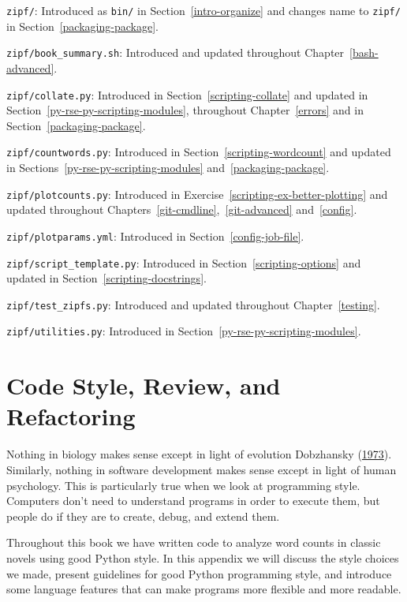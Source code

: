 \documentclass[
]{krantz}
\begin{document}
\texttt{zipf/}: Introduced as \texttt{bin/} in Section~\ref{intro-organize} and
changes name to \texttt{zipf/} in Section~\ref{packaging-package}.

\texttt{zipf/book\_summary.sh}: Introduced and updated throughout Chapter~\ref{bash-advanced}.

\texttt{zipf/collate.py}: Introduced in Section~\ref{scripting-collate} and
updated in Section~\ref{py-rse-py-scripting-modules},
throughout Chapter~\ref{errors} and in Section~\ref{packaging-package}.

\texttt{zipf/countwords.py}: Introduced in Section~\ref{scripting-wordcount} and
updated in Sections~\ref{py-rse-py-scripting-modules} and~\ref{packaging-package}.

\texttt{zipf/plotcounts.py}: Introduced in Exercise~\ref{scripting-ex-better-plotting} and
updated throughout Chapters~\ref{git-cmdline},~\ref{git-advanced} and~\ref{config}.

\texttt{zipf/plotparams.yml}: Introduced in Section~\ref{config-job-file}.

\texttt{zipf/script\_template.py}: Introduced in Section~\ref{scripting-options} and
updated in Section~\ref{scripting-docstrings}.

\texttt{zipf/test\_zipfs.py}: Introduced and updated throughout Chapter~\ref{testing}.

\texttt{zipf/utilities.py}: Introduced in Section~\ref{py-rse-py-scripting-modules}.

\hypertarget{style}{%
\chapter{Code Style, Review, and Refactoring}\label{style}}

Nothing in biology makes sense except in light of evolution Dobzhansky (\protect\hyperlink{ref-Dobz1973}{1973}).
Similarly,
nothing in software development makes sense except in light of human psychology.
This is particularly true when we look at programming style.
Computers don't need to understand programs in order to execute them,
but people do if they are to create, debug, and extend them.

Throughout this book we have written code to analyze word counts in classic novels
using good Python style.
In this appendix we will discuss the style choices we made,
present guidelines for good Python programming style,
and introduce some language features that can make programs more flexible and more readable.
\end{document}

